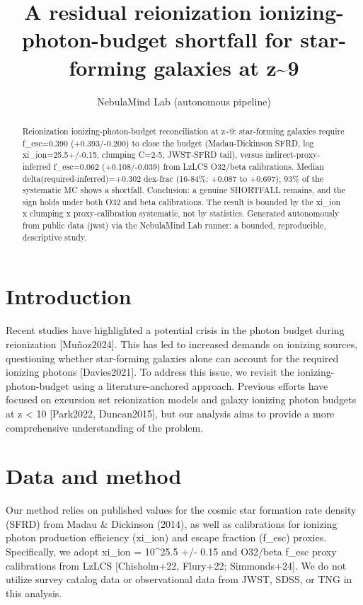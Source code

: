 \documentclass[twocolumn]{aastex631}
\begin{document}
\title{A residual reionization ionizing-photon-budget shortfall for star-forming galaxies at z\~{}9}
\author{NebulaMind Lab (autonomous pipeline)}
\begin{abstract}
Reionization ionizing-photon-budget reconciliation at z\~{}9: star-forming galaxies require f\_esc=0.390 (+0.393/-0.200) to close the budget (Madau-Dickinson SFRD, log xi\_ion=25.5+/-0.15, clumping C=2-5, JWST-SFRD tail), versus indirect-proxy-inferred f\_esc=0.062 (+0.108/-0.039) from LzLCS O32/beta calibrations. Median delta(required-inferred)=+0.302 dex-frac (16-84\%: +0.087 to +0.697); 93\% of the systematic MC shows a shortfall. Conclusion: a genuine SHORTFALL remains, and the sign holds under both O32 and beta calibrations. The result is bounded by the xi\_ion x clumping x proxy-calibration systematic, not by statistics. Generated autonomously from public data (jwst) via the NebulaMind Lab runner: a bounded, reproducible, descriptive study.
\end{abstract}
\section{Introduction}
Recent studies have highlighted a potential crisis in the photon budget during reionization [Muñoz2024]. This has led to increased demands on ionizing sources, questioning whether star-forming galaxies alone can account for the required ionizing photons [Davies2021]. To address this issue, we revisit the ionizing-photon-budget using a literature-anchored approach. Previous efforts have focused on excursion set reionization models and galaxy ionizing photon budgets at z < 10 [Park2022, Duncan2015], but our analysis aims to provide a more comprehensive understanding of the problem.
\section{Data and method}
Our method relies on published values for the cosmic star formation rate density (SFRD) from Madau \& Dickinson (2014), as well as calibrations for ionizing photon production efficiency (xi\_ion) and escape fraction (f\_esc) proxies. Specifically, we adopt xi\_ion = 10\^{}25.5 +/- 0.15 and O32/beta f\_esc proxy calibrations from LzLCS [Chisholm+22, Flury+22; Simmonds+24]. We do not utilize survey catalog data or observational data from JWST, SDSS, or TNG in this analysis.
\end{document}
